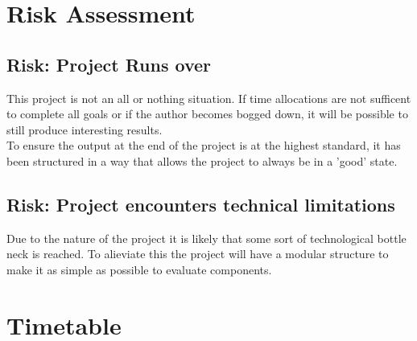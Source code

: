 \documentclass[a4paper,12pt,notitlepage]{article}
\begin{document}
\section{Risk Assessment}
\subsection*{Risk: Project Runs over}
This project is not an all or nothing situation. If time allocations are not
sufficent to complete all goals or if the author becomes bogged down, it will
be possible to still produce interesting results.\\

To ensure the output at the end of the project is at the highest standard, it has
been structured in a way that allows the project to always be in a 'good' state.

\subsection*{Risk: Project encounters technical limitations}
Due to the nature of the project it is likely that some sort of technological 
bottle neck is reached. To alieviate this the project will have a modular 
structure to make it as simple as possible to evaluate components.

\section{Timetable}

\begin{ganttchart}[vgrid, hgrid, time slot modifier=0,x unit=0.8cm]{15}
	 \\
	
	 \\

	 \\
	 \\
	 \\
	 \\
	 \\
	 \\
\end{ganttchart}
\end{document}
